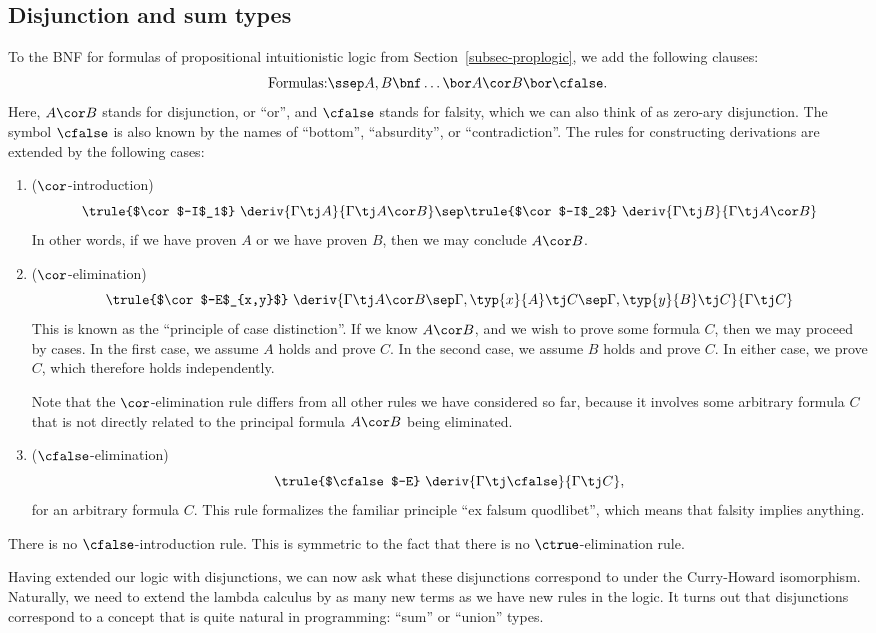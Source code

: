 \documentclass[12pt]{article}
\begin{document}
\subsection{Disjunction and sum types}

To the BNF for formulas of propositional intuitionistic logic from
Section~\ref{subsec-proplogic}, we add the following clauses:
\[ \mbox{Formulas:}\ssep A,B \bnf \ldots \bor A\cor B \bor \cfalse.
\]
Here, $A\cor B$ stands for disjunction, or ``or'', and $\cfalse$
stands for falsity, which we can also think of as zero-ary
disjunction.  The symbol $\cfalse$ is also known by the names of
``bottom'', ``absurdity'', or ``contradiction''.  The rules for
constructing derivations are extended by the following cases:
\begin{enumerate}
\resumeenumerate
\item ($\cor$-introduction)
\[ \trule{$\cor$-I$_1$}\ \deriv{\Gamma\tj A}{\Gamma\tj A\cor B}
\sep
\trule{$\cor$-I$_2$}\ \deriv{\Gamma\tj B}{\Gamma\tj A\cor B}
\]
In other words, if we have proven $A$ or we have proven $B$, then we
may conclude $A\cor B$.
\item ($\cor$-elimination)
\[ \trule{$\cor$-E$_{x,y}$}\ \deriv{\Gamma\tj A\cor B
  \sep \Gamma,\typ{x}{A}\tj C
  \sep \Gamma,\typ{y}{B}\tj C}{\Gamma\tj C}
\]
This is known as the ``principle of case distinction''. If we know
$A\cor B$, and we wish to prove some formula $C$, then we may proceed
by cases. In the first case, we assume $A$ holds and prove $C$. In the
second case, we assume $B$ holds and prove $C$. In either case, we
prove $C$, which therefore holds independently. 

Note that the $\cor$-elimination rule differs from all other rules we
have considered so far, because it involves some arbitrary formula $C$
that is not directly related to the principal formula $A\cor B$ being
eliminated.
\item ($\cfalse$-elimination)
\[ \trule{$\cfalse$-E}\ \deriv{\Gamma\tj\cfalse}{\Gamma\tj C},
\]
for an arbitrary formula $C$. This rule formalizes the familiar
principle ``ex falsum quodlibet'', which means that falsity implies
anything.
\end{enumerate}

There is no $\cfalse$-introduction rule. This is symmetric to the fact
that there is no $\ctrue$-elimination rule.

Having extended our logic with disjunctions, we can now ask what these
disjunctions correspond to under the Curry-Howard isomorphism.
Naturally, we need to extend the lambda calculus by as many new terms
as we have new rules in the logic. It turns out that disjunctions
correspond to a concept that is quite natural in programming: ``sum'' or
``union'' types. 
\end{document}
